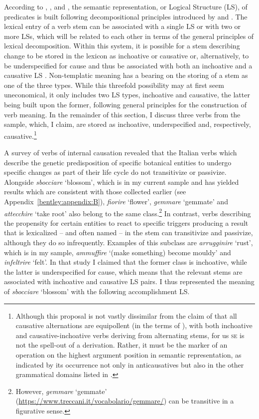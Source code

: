\documentclass[output=paper,colorlinks,citecolor=brown
]{langscibook}
\begin{document}
According to \citet[82--129]{vanvalin1997syntax}, \citet[32--49]{vanvalin2005exploring}, and \citet[94--107]{vanvalin2023principles}, the semantic representation, or Logical Structure (LS), of predicates is built following decompositional principles introduced by \citet{vendler1967linguistics} and \citet{dowty1979word}. The lexical entry of a verb stem can be associated with a single LS or with two or more LSs, which will be related to each other in terms of the general principles of lexical decomposition. Within this system, it is possible for a stem describing change to be stored in the lexicon as inchoative or causative or, alternatively, to be underspecified for cause and thus be associated with both an inchoative and a causative LS \citep{brocher2017full}. Non-templatic meaning has a bearing on the storing of a stem as one of the three types. While this threefold possibility may at first seem uneconomical, it only includes two LS types, inchoative and causative, the latter being built upon the former, following general principles for the construction of verb meaning. In the remainder of this section, I discuss three verbs from the sample, which, I claim, are stored as inchoative, underspecified and, respectively, causative.\footnote{Although this proposal is not vastly dissimilar from the claim of \citet{pinon2001finer} that all causative alternations are equipollent (in the terms of \cite{haspelmath1993more}), with both inchoative and causative-inchoative verbs deriving from alternating stems, for us \textsc{se} is not the spell-out of a derivation. Rather, it must be the marker of an operation on the highest argument position in semantic representation, as indicated by its occurrence not only in anticausatives but also in the other grammatical domains listed in .}

A survey of verbs of internal causation \citep{bentley2023internally} revealed that the Italian verbs which describe the genetic predisposition of specific botanical entities to undergo specific changes as part of their life cycle do not transitivize or passivize. Alongside \textit{sbocciare} ‘blossom’, which is in my current sample and has yielded results which are consistent with those collected earlier (see Appendix~\ref{bentley:appendix:B}), \textit{fiorire} ‘flower’, \textit{gemmare} ‘gemmate’ and \textit{attecchire} ‘take root’ also belong to the same class.\footnote{However, \textit{gemmare} ‘gemmate’ (\url{https://www.treccani.it/vocabolario/gemmare/}) can be transitive in a figurative sense.}   In contrast, verbs describing the propensity for certain entities to react to specific triggers producing a result that is lexicalized – and often named – in the stem can transitivize and passivize, although they do so infrequently. Examples of this subclass are \textit{arrugginire} ‘rust’, which is in my sample, \textit{ammuffire} ‘(make something) become mouldy’ and \textit{infeltrire} ‘felt’. In that study I claimed that the former class is inchoative, while the latter is underspecified for cause, which means that the relevant stems are associated with inchoative and causative LS pairs. I thus represented the meaning of \textit{sbocciare} ‘blossom’ with the following accomplishment LS. 
\end{document}
